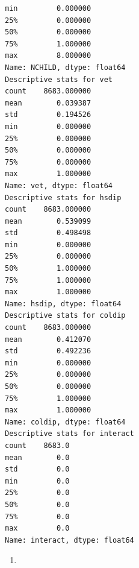 \documentclass[
  letterpaper,
  DIV=11,
  numbers=noendperiod]{scrartcl}
\providecommand{\tightlist}{%
  \setlength{\itemsep}{0pt}\setlength{\parskip}{0pt}}\usepackage{longtable,booktabs,array}
\begin{document}
\begin{verbatim}
min         0.000000
25%         0.000000
50%         0.000000
75%         1.000000
max         8.000000
Name: NCHILD, dtype: float64
Descriptive stats for vet
count    8683.000000
mean        0.039387
std         0.194526
min         0.000000
25%         0.000000
50%         0.000000
75%         0.000000
max         1.000000
Name: vet, dtype: float64
Descriptive stats for hsdip
count    8683.000000
mean        0.539099
std         0.498498
min         0.000000
25%         0.000000
50%         1.000000
75%         1.000000
max         1.000000
Name: hsdip, dtype: float64
Descriptive stats for coldip
count    8683.000000
mean        0.412070
std         0.492236
min         0.000000
25%         0.000000
50%         0.000000
75%         1.000000
max         1.000000
Name: coldip, dtype: float64
Descriptive stats for interact
count    8683.0
mean        0.0
std         0.0
min         0.0
25%         0.0
50%         0.0
75%         0.0
max         0.0
Name: interact, dtype: float64
\end{verbatim}

\begin{enumerate}
\def\labelenumi{\arabic{enumi}.}
\setcounter{enumi}{1}
\tightlist
\item
\end{enumerate}
\end{document}
